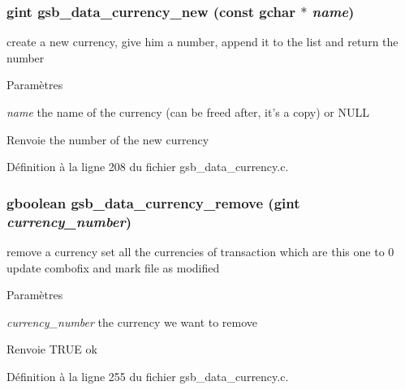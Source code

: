\subsubsection[{gsb\_\-data\_\-currency\_\-new}]{\setlength{\rightskip}{0pt plus 5cm}gint gsb\_\-data\_\-currency\_\-new (const gchar $\ast$ {\em name})}\label{gsb__data__currency_8h_aa3658e529b7b58f87f6231a87a3e7a75}
create a new currency, give him a number, append it to the list and return the number


\begin{DoxyParams}{Paramètres}
\item[{\em name}]the name of the currency (can be freed after, it's a copy) or NULL\end{DoxyParams}
\begin{DoxyReturn}{Renvoie}
the number of the new currency 
\end{DoxyReturn}


Définition à la ligne 208 du fichier gsb\_\-data\_\-currency.c.

\subsubsection[{gsb\_\-data\_\-currency\_\-remove}]{\setlength{\rightskip}{0pt plus 5cm}gboolean gsb\_\-data\_\-currency\_\-remove (gint {\em currency\_\-number})}\label{gsb__data__currency_8h_ab472787699476a611a2d16a04a980d83}
remove a currency set all the currencies of transaction which are this one to 0 update combofix and mark file as modified


\begin{DoxyParams}{Paramètres}
\item[{\em currency\_\-number}]the currency we want to remove\end{DoxyParams}
\begin{DoxyReturn}{Renvoie}
TRUE ok 
\end{DoxyReturn}


Définition à la ligne 255 du fichier gsb\_\-data\_\-currency.c.

